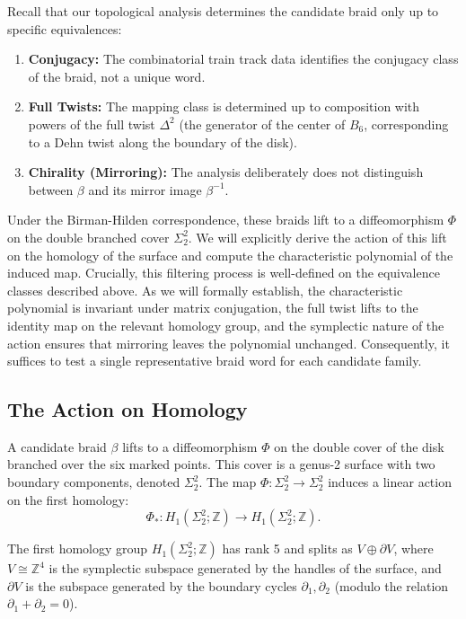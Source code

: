 Recall that our topological analysis determines the candidate braid only up to specific equivalences:
\begin{enumerate}
    \item \textbf{Conjugacy:} The combinatorial train track data identifies the conjugacy class of the braid, not a unique word.
    \item \textbf{Full Twists:} The mapping class is determined up to composition with powers of the full twist $\Delta^2$ (the generator of the center of $B_6$, corresponding to a Dehn twist along the boundary of the disk).
    \item \textbf{Chirality (Mirroring):} The analysis deliberately does not distinguish between $\beta$ and its mirror image $\beta^{-1}$.
\end{enumerate}

Under the Birman-Hilden correspondence, these braids lift to a diffeomorphism $\Phi$ on the double branched cover $\Sigma_2^2$. We will explicitly derive the action of this lift on the homology of the surface and compute the characteristic polynomial of the induced map. Crucially, this filtering process is well-defined on the equivalence classes described above. As we will formally establish, the characteristic polynomial is invariant under matrix conjugation, the full twist lifts to the identity map on the relevant homology group, and the symplectic nature of the action ensures that mirroring leaves the polynomial unchanged. Consequently, it suffices to test a single representative braid word for each candidate family.

\subsection{The Action on Homology}

A candidate braid $\beta$ lifts to a diffeomorphism $\Phi$ on the double cover of the disk branched over the six marked points. This cover is a genus-2 surface with two boundary components, denoted $\Sigma_2^2$. The map $\Phi \colon \Sigma_2^2 \to \Sigma_2^2$ induces a linear action on the first homology:
\[
\Phi_* \colon H_1(\Sigma_2^2; \mathbb{Z}) \to H_1(\Sigma_2^2; \mathbb{Z}).
\]

The first homology group $H_1(\Sigma_2^2; \mathbb{Z})$ has rank 5 and splits as $V \oplus \partial V$, where $V \cong \mathbb{Z}^4$ is the symplectic subspace generated by the handles of the surface, and $\partial V$ is the subspace generated by the boundary cycles $\partial_1, \partial_2$ (modulo the relation $\partial_1 + \partial_2 = 0$).

